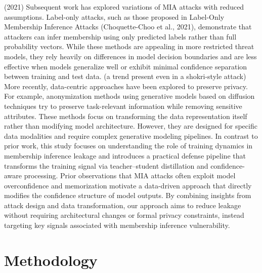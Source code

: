 \documentclass[conference]{IEEEtran}
\begin{document}
(2021)
Subsequent work has explored variations of MIA attacks with reduced assumptions. Label-only attacks, such as those proposed in Label-Only Membership Inference Attacks (Choquette-Choo et al., 2021), demonstrate that attackers can infer membership using only predicted labels rather than full probability vectors. While these methods are appealing in more restricted threat models, they rely heavily on differences in model decision boundaries and are less effective when models generalize well or exhibit minimal confidence separation between training and test data. (a trend present even in a shokri-style attack)
More recently, data-centric approaches have been explored to preserve privacy. For example, anonymization methods using generative models based on diffusion techniques try to preserve task-relevant information while removing sensitive attributes. These methods focus on transforming the data representation itself rather than modifying model architecture. However, they are designed for specific data modalities and require complex generative modeling pipelines.
In contrast to prior work, this study focuses on understanding the role of training dynamics in membership inference leakage and introduces a practical defense pipeline that transforms the training signal via teacher--student distillation and confidence-aware processing. Prior observations that MIA attacks often exploit model overconfidence and memorization motivate a data-driven approach that directly modifies the confidence structure of model outputs. By combining insights from attack design and data transformation, our approach aims to reduce leakage without requiring architectural changes or formal privacy constraints, instead targeting key signals associated with membership inference vulnerability.


\section{Methodology}
\end{document}
